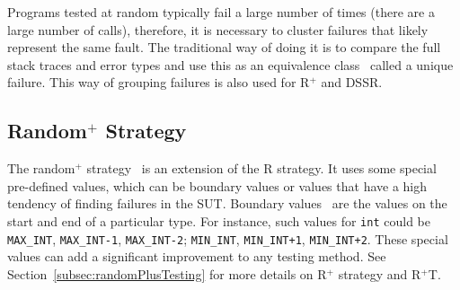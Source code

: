 Programs tested at random typically fail a large number of times (there are a large number of calls), therefore, it is necessary to cluster failures that likely represent the same fault. The traditional way of doing it is to compare the full stack traces and error types and use this as an equivalence class~\cite{ciupa2007experimental, oriol2012random} called a unique failure. This way of grouping failures is also used for R$^+$ and DSSR. 

\subsection{Random$^+$ Strategy}
The random$^+$ strategy~\cite{leitner2007reconciling} is an extension of the R strategy. It uses some special pre-defined values, which can be boundary values or values that have a high tendency of finding failures in the SUT. Boundary values~\cite{beizer2003software} are the values on the start and end of a particular type. For instance, such values for \verb+int+ could be \verb+MAX_INT+, \verb+MAX_INT-1+, \verb+MAX_INT-2+; \verb+MIN_INT+, \verb-MIN_INT+1-, \verb-MIN_INT+2-. These special values can add a significant improvement to any testing method. See Section~\ref{subsec:randomPlusTesting} for more details on R$^+$ strategy and R$^+$T.




